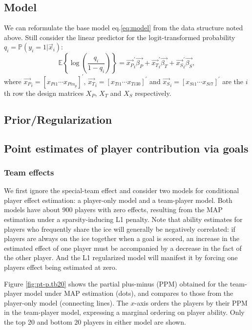 \subsection{Model}
We can reformulate the base model eq.\eqref{eq:model} from the data structure noted above. Still consider the linear predictor for the logit-transformed probability $q_i=\mathbb{P}(y_i=1|\vec{x}_i)$: 
\begin{equation}
\mathbb{E}\left\{\log \left(\frac{q_i}{1-q_i} \right)\right\} 
= \vec{x_P}^\prime_i \vec{\beta_P} + \vec{x_T}^\prime_i \vec{\beta_T} + \vec{x_S}^\prime_i\vec{\beta_S} ,
\label{eq:model.ext}
\end{equation}
where $\vec{x_P}_i = [x_{Pi1} \cdots x_{Pin_p}]^\prime$,  $\vec{x_T}_i = [x_{Ti1} \cdots x_{Ti30}]^\prime$ and $\vec{x_S}_i = [x_{Si1} \cdots x_{Si7}]^\prime$ are the $i$th row the design matrices $X_P$, $X_T$ and $X_S$ respectively. 

\subsection{Prior/Regularization} 

 
\subsection{Point estimates of player contribution via goals}
\subsubsection{Team effects}
We first ignore the special-team effect and consider two models for conditional player effect estimation: a player-only model and a team-player model. Both models have about 900 players with zero effects, resulting from the MAP estimation under a sparsity-inducing L1 penalty. Note that ability estimates for players who frequently share the ice will generally be negatively correlated: if players are always on the ice together when a goal is scored, an increase in the estimated effect of one player must be accompanied by a decrease in the fact of the other player. And the L1 regularized model will manifest it by forcing one players effect being estimated at zero.

Figure \ref{fig:pt-p.tb20} shows the partial plus-minus (PPM) obtained for the team-player model under MAP estimation (dots), and compares to those from the player-only model (connecting lines). The $x$-axis orders the players by their PPM in the team-player model, expressing a marginal ordering on player ability. Only the top 20 and bottom 20 players in either model are shown. 

